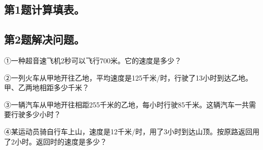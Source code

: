 \subsection*{第1题\quad 计算填表。}
\subsection*{第2题\quad 解决问题。}
\noindent ①一种超音速飞机2秒可以飞行700米。它的速度是多少？\par
{}
\noindent ②一列火车从甲地开往乙地，平均速度是125千米/时，行驶了13小时到达乙地。甲、乙两地相距多少千米？\par
{}
\noindent ③一辆汽车从甲地开往相距255千米的乙地，每小时行驶85千米。这辆汽车一共需要行驶多少小时？\par
{}
\noindent ④某运动员骑自行车上山，速度是12千米/时，用了3小时到达山顶。按原路返回用了2小时。返回时的速度是多少？\par
{}
